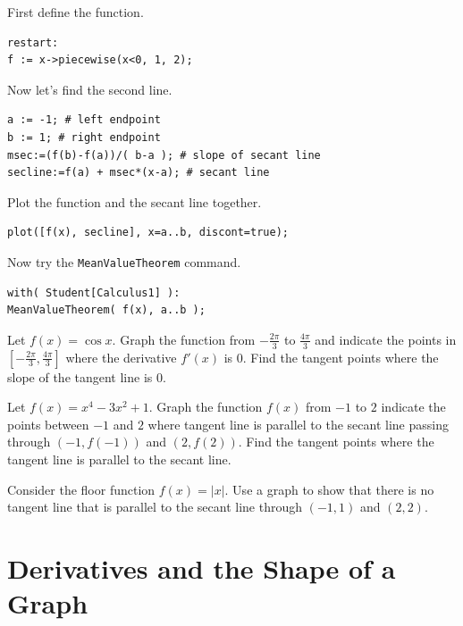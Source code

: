 \documentclass[en,11pt,simple]{elegantbook}
\let\BeginKnitrBlock\begin \let\EndKnitrBlock\end
\begin{document}
\BeginKnitrBlock{solution}{}{}
{}
First define the function.

\begin{verbatim}
restart:
f := x->piecewise(x<0, 1, 2);
\end{verbatim}

Now let's find the second line.

\begin{verbatim}
a := -1; # left endpoint
b := 1; # right endpoint
msec:=(f(b)-f(a))/( b-a ); # slope of secant line
secline:=f(a) + msec*(x-a); # secant line
\end{verbatim}

Plot the function and the secant line together.

\begin{verbatim}
plot([f(x), secline], x=a..b, discont=true);
\end{verbatim}

Now try the \texttt{MeanValueTheorem} command.

\begin{verbatim}
with( Student[Calculus1] ):
MeanValueTheorem( f(x), a..b );
\end{verbatim}
\EndKnitrBlock{solution}

\BeginKnitrBlock{exercise}{}{}
\protect\hypertarget{exr:unnamed-chunk-102}{}{\label{exr:unnamed-chunk-102} }
Let \(f(x)=\cos x\). Graph the function from \(-\frac{2\pi}{3}\) to \(\frac{4\pi}{3}\) and indicate the points in \([-\frac{2\pi}{3}, \frac{4\pi}{3}]\) where the derivative \(f'(x)\) is \(0\). Find the tangent points where the slope of the tangent line is \(0\).
\EndKnitrBlock{exercise}

\BeginKnitrBlock{exercise}{}{}
\protect\hypertarget{exr:unnamed-chunk-103}{}{\label{exr:unnamed-chunk-103} }
Let \(f(x)=x^4-3x^2+1\). Graph the function \(f(x)\) from \(-1\) to \(2\) indicate the points between \(-1\) and \(2\) where tangent line is parallel to the secant line passing through \((-1, f(-1))\) and \((2, f(2))\). Find the tangent points where the tangent line is parallel to the secant line.
\EndKnitrBlock{exercise}

\BeginKnitrBlock{exercise}{}{}
\protect\hypertarget{exr:unnamed-chunk-104}{}{\label{exr:unnamed-chunk-104} }
Consider the floor function \(f(x)=|x|\). Use a graph to show that there is no tangent line that is parallel to the secant line through \((-1, 1)\) and \((2,2)\).
\EndKnitrBlock{exercise}

\hypertarget{derivatives-and-the-shape-of-a-graph}{%
\section{Derivatives and the Shape of a Graph}\label{derivatives-and-the-shape-of-a-graph}}
\end{document}
